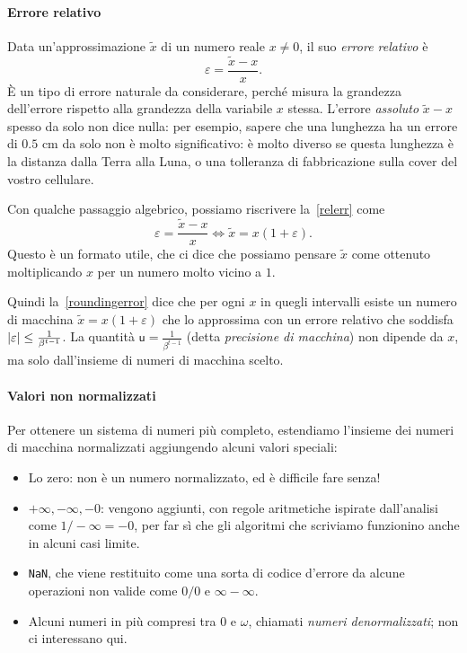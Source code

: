 \documentclass[a4paper]{report}
\DeclarePairedDelimiter{\abs}{\lvert}{\rvert}
\theoremstyle{definition}
\theoremstyle{remark}
\begin{document}
\paragraph{Errore relativo}
Data un'approssimazione $\tilde{x}$ di un numero reale $x \neq 0$, il suo \emph{errore relativo} è
\begin{equation} \label{relerr}
    \varepsilon = \frac{\tilde{x}-x}{x}.    
\end{equation}
È un tipo di errore naturale da considerare, perché misura la grandezza dell'errore rispetto alla grandezza della variabile $x$ stessa. L'errore \emph{assoluto} $\tilde{x}-x$ spesso da solo non dice nulla: per esempio, sapere che una lunghezza ha un errore di $0.5 \text{ cm}$ da solo non è molto significativo: è molto diverso se questa lunghezza è la distanza dalla Terra alla Luna, o una tolleranza di fabbricazione sulla cover del vostro cellulare.

Con qualche passaggio algebrico, possiamo riscrivere la~\eqref{relerr} come
\begin{equation}\label{errore relativo in due forme}
    \varepsilon = \frac{\tilde{x}-x}{x} \iff \tilde{x} = x(1+\varepsilon).
\end{equation}
Questo è un formato utile, che ci dice che possiamo pensare $\tilde{x}$ come ottenuto moltiplicando $x$ per un numero molto vicino a $1$.

Quindi la~\eqref{roundingerror} dice che per ogni $x$ in quegli intervalli esiste un numero di macchina $\tilde{x} = x(1+\varepsilon)$ che lo approssima con un errore relativo che soddisfa $\abs{\varepsilon} \leq \frac{1}{\beta^{t-1}}$. La quantità $\mathsf{u} = \frac{1}{\beta^{t-1}}$ (detta \emph{precisione di macchina}) non dipende da $x$, ma solo dall'insieme di numeri di macchina scelto.

\paragraph{Valori non normalizzati}
Per ottenere un sistema di numeri più completo, estendiamo l'insieme dei numeri di macchina normalizzati aggiungendo alcuni valori speciali:
\begin{itemize}
    \item Lo zero: non è un numero normalizzato, ed è difficile fare senza!
    \item $+\infty, -\infty, -0$: vengono aggiunti, con regole aritmetiche ispirate dall'analisi come $1/-\infty = -0$, per far sì che gli algoritmi che scriviamo funzionino anche in alcuni casi limite.
    \item \texttt{NaN}, che viene restituito come una sorta di codice d'errore da alcune operazioni non valide come $0/0$ e $\infty-\infty$.
    \item Alcuni numeri in più compresi tra $0$ e $\omega$, chiamati \emph{numeri denormalizzati}; non ci interessano qui.
\end{itemize}
\end{document}
